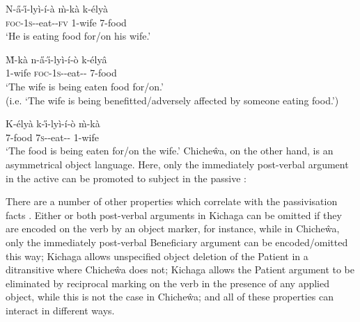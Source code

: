 \documentclass[output=paper]{langscibook}
\begin{document}
\ea\label{ex:kichaga-passive-facts}
\ea\label{kichagaappl} {
  \gll N-\H{a}-\H{\i}-ly\`{i}-\'{i}-\`{a} \`{m}-k\`{a} k-\'{e}ly\`{a} \\
  \textsc{foc}-1\textsc{s}-\PRS-eat-\APPL-\textsc{fv} 1-wife 7-food\\
  \glt `He is eating food for\slash on his wife.'\\
}

\ex \label{kichagaapplpassivized1} {
  \gll  \`{M}-k\`{a} n-\H{a}-\H{\i}-ly\`{i}-\'{i}-\`{o} k-\'{e}ly\^{a}\\
  1-wife {\textsc{foc}-1\textsc{s}-\PRS-eat-\APPL-\PASS} 7-food \\
  \glt `The wife is being eaten food for\slash on.'\\ (i.e. `The wife is being benefitted\slash adversely affected by someone eating food.')\\
}

\ex \label{kichagaapplpassivized2}
\gll K-\'{e}ly\`{a} k-\H{\i}-ly\`{i}-\'{i}-\`{o} \`{m}-k\`{a}\\
7-food {7\textsc{s}-\PRS-eat-\APPL-\PASS} 1-wife\\
\glt `The food is being eaten for\slash on the wife.'%
\z
\z
%
Chiche\^{w}a, on the other hand, is an asymmetrical object language. Here, only
the immediately post-verbal argument in the active can be promoted to subject in
the passive \citep[248]{Baker1988}:

\ea\label{ex:chichewa-passive-facts}


%
\z
\z

There are a number of other properties which correlate with the passivisation
facts \citep[150--153]{BresMosh90}. Either or both post-verbal arguments in
Kichaga can be omitted if they are encoded on the verb by an object marker, for
instance, while in Chiche\^{w}a, only the immediately post-verbal Beneficiary
argument can be encoded\slash omitted this way; Kichaga allows unspecified
object deletion of the Patient in a ditransitive where Chiche\^{w}a does not;
Kichaga allows the Patient argument to be eliminated by reciprocal marking on
the verb in the presence of any applied object, while this is not the case in
Chiche\^{w}a; and all of these properties can interact in different ways.
\end{document}

